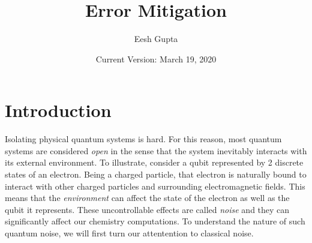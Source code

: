 \documentclass{article}
\title{Error Mitigation}
\author{Eesh Gupta }
\date{Current Version: March 19, 2020}
\begin{document}
\maketitle
\tableofcontents
\newpage
\section{Introduction}
Isolating physical quantum systems is hard. For this reason, most quantum
systems are considered \textit{open} in the sense that the system
inevitably interacts with its external environment. To illustrate, consider
a qubit represented by 2 discrete states of an electron. Being a charged
particle, that electron is naturally bound to interact with other charged
particles and surrounding electromagnetic fields. This means that the
\textit{environment} can affect the state of the electron as well as the
qubit it represents. These uncontrollable effects are called \textit{noise}
and they can significantly affect our chemistry computations. To understand
the nature of such quantum noise, we will first turn our attentention to
classical noise.
\end{document}
